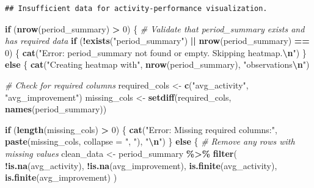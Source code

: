 \documentclass[
]{article}
\newenvironment{Shaded}{\begin{snugshade}}{\end{snugshade}}
\newcommand{\AttributeTok}[1]{\textcolor[rgb]{0.13,0.29,0.53}{#1}}
\newcommand{\CommentTok}[1]{\textcolor[rgb]{0.56,0.35,0.01}{\textit{#1}}}
\newcommand{\ControlFlowTok}[1]{\textcolor[rgb]{0.13,0.29,0.53}{\textbf{#1}}}
\newcommand{\DecValTok}[1]{\textcolor[rgb]{0.00,0.00,0.81}{#1}}
\newcommand{\FunctionTok}[1]{\textcolor[rgb]{0.13,0.29,0.53}{\textbf{#1}}}
\newcommand{\NormalTok}[1]{#1}
\newcommand{\OtherTok}[1]{\textcolor[rgb]{0.56,0.35,0.01}{#1}}
\newcommand{\SpecialCharTok}[1]{\textcolor[rgb]{0.81,0.36,0.00}{\textbf{#1}}}
\newcommand{\StringTok}[1]{\textcolor[rgb]{0.31,0.60,0.02}{#1}}
\begin{document}
\begin{verbatim}
## Insufficient data for activity-performance visualization.
\end{verbatim}

\begin{Shaded}
\begin{Highlighting}[]
\ControlFlowTok{if}\NormalTok{ (}\FunctionTok{nrow}\NormalTok{(period\_summary) }\SpecialCharTok{\textgreater{}} \DecValTok{0}\NormalTok{) \{}
    \CommentTok{\# Validate that period\_summary exists and has required data}
    \ControlFlowTok{if}\NormalTok{ (}\SpecialCharTok{!}\FunctionTok{exists}\NormalTok{(}\StringTok{"period\_summary"}\NormalTok{) }\SpecialCharTok{||} \FunctionTok{nrow}\NormalTok{(period\_summary) }\SpecialCharTok{==} \DecValTok{0}\NormalTok{) \{}
        \FunctionTok{cat}\NormalTok{(}\StringTok{"Error: period\_summary not found or empty. Skipping heatmap.}\SpecialCharTok{\textbackslash{}n}\StringTok{"}\NormalTok{)}
\NormalTok{    \} }\ControlFlowTok{else}\NormalTok{ \{}
        \FunctionTok{cat}\NormalTok{(}\StringTok{"Creating heatmap with"}\NormalTok{, }\FunctionTok{nrow}\NormalTok{(period\_summary), }\StringTok{"observations}\SpecialCharTok{\textbackslash{}n}\StringTok{"}\NormalTok{)}

        \CommentTok{\# Check for required columns}
\NormalTok{        required\_cols }\OtherTok{\textless{}{-}} \FunctionTok{c}\NormalTok{(}\StringTok{"avg\_activity"}\NormalTok{, }\StringTok{"avg\_improvement"}\NormalTok{)}
\NormalTok{        missing\_cols }\OtherTok{\textless{}{-}} \FunctionTok{setdiff}\NormalTok{(required\_cols, }\FunctionTok{names}\NormalTok{(period\_summary))}

        \ControlFlowTok{if}\NormalTok{ (}\FunctionTok{length}\NormalTok{(missing\_cols) }\SpecialCharTok{\textgreater{}} \DecValTok{0}\NormalTok{) \{}
            \FunctionTok{cat}\NormalTok{(}\StringTok{"Error: Missing required columns:"}\NormalTok{, }\FunctionTok{paste}\NormalTok{(missing\_cols, }\AttributeTok{collapse =} \StringTok{", "}\NormalTok{), }\StringTok{"}\SpecialCharTok{\textbackslash{}n}\StringTok{"}\NormalTok{)}
\NormalTok{        \} }\ControlFlowTok{else}\NormalTok{ \{}
            \CommentTok{\# Remove any rows with missing values}
\NormalTok{            clean\_data }\OtherTok{\textless{}{-}}\NormalTok{ period\_summary }\SpecialCharTok{\%\textgreater{}\%}
                \FunctionTok{filter}\NormalTok{(}
                    \SpecialCharTok{!}\FunctionTok{is.na}\NormalTok{(avg\_activity), }\SpecialCharTok{!}\FunctionTok{is.na}\NormalTok{(avg\_improvement),}
                    \FunctionTok{is.finite}\NormalTok{(avg\_activity), }\FunctionTok{is.finite}\NormalTok{(avg\_improvement)}
\NormalTok{                )}


\end{Highlighting}
\end{Shaded}
\end{document}
